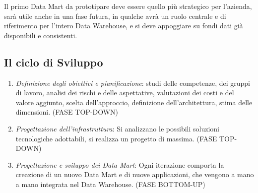 Il primo Data Mart da prototipare deve essere quello più strategico per l'azienda, sarà utile anche in una fase futura, in qualche avrà un ruolo centrale e di riferimento per l'intero Data Warehouse, e si deve appoggiare su fondi dati già disponibili e consistenti.

\subsection{Il ciclo di Sviluppo}

\begin{enumerate}
	\item \textit{Definizione degli obiettivi e pianificazione}: studi delle competenze, dei gruppi di lavoro, analisi dei rischi e delle aspettative, valutazioni dei costi e del valore aggiunto, scelta dell'approccio, definizione dell'architettura, stima delle dimensioni. (FASE TOP-DOWN)
	\item \textit{Progettazione dell'infrastruttura}: Si analizzano le possibili soluzioni tecnologiche adottabili, si realizza un progetto di massima. (FASE TOP-DOWN)
	\item \textit{Progettazione e sviluppo dei Data Mart}: Ogni iterazione comporta la creazione di un nuovo Data Mart e di nuove applicazioni, che vengono a mano a mano integrata nel Data Warehouse. (FASE BOTTOM-UP)
\end{enumerate}

\newpage
